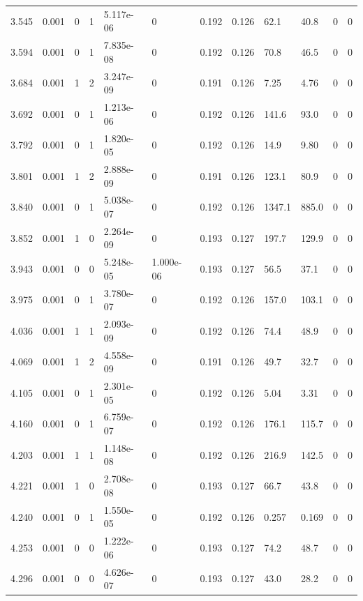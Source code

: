 \documentclass[preview]{standalone}
\begin{document}
{{{\begin{tabular}{L{1.2cm}C{1.2cm} C{0.3cm}C{0.5cm} C{1.4cm}C{1.4cm} C{1.4cm}C{1.4cm} C{1.6cm}C{1.6cm} C{1.6cm}C{1.6cm}}
  3.545  &  0.001  & 0     &  1 &  5.117e-06  & 0  &  0.192&   0.126& 62.1 & 40.8   &  0 & 0  \\ 
  3.594  &  0.001  & 0     &  1 &  7.835e-08  & 0  &  0.192&   0.126& 70.8 & 46.5   &  0 & 0  \\ 
  3.684  &  0.001  & 1     &  2 &  3.247e-09  & 0  &  0.191&   0.126& 7.25 & 4.76   &  0 & 0  \\ 
  3.692  &  0.001  & 0     &  1 &  1.213e-06  & 0  &  0.192&   0.126& 141.6 & 93.0   &  0 & 0  \\ 
  3.792  &  0.001  & 0     &  1 &  1.820e-05  & 0  &  0.192&   0.126& 14.9 & 9.80   &  0 & 0  \\ 
  3.801  &  0.001  & 1     &  2 &  2.888e-09  & 0  &  0.191&   0.126& 123.1 & 80.9   &  0 & 0  \\ 
  3.840  &  0.001  & 0     &  1 &  5.038e-07  & 0  &  0.192&   0.126& 1347.1 & 885.0   &  0 & 0  \\ 
  3.852  &  0.001  & 1     &  0 &  2.264e-09  & 0  &  0.193&   0.127& 197.7 & 129.9   &  0 & 0  \\ 
  3.943  &  0.001  & 0     &  0 &  5.248e-05  & 1.000e-06  &  0.193&   0.127& 56.5 & 37.1   &  0 & 0  \\ 
  3.975  &  0.001  & 0     &  1 &  3.780e-07  & 0  &  0.192&   0.126& 157.0 & 103.1   &  0 & 0  \\ 
  4.036  &  0.001  & 1     &  1 &  2.093e-09  & 0  &  0.192&   0.126& 74.4 & 48.9   &  0 & 0  \\ 
  4.069  &  0.001  & 1     &  2 &  4.558e-09  & 0  &  0.191&   0.126& 49.7 & 32.7   &  0 & 0  \\ 
  4.105  &  0.001  & 0     &  1 &  2.301e-05  & 0  &  0.192&   0.126& 5.04 & 3.31   &  0 & 0  \\ 
  4.160  &  0.001  & 0     &  1 &  6.759e-07  & 0  &  0.192&   0.126& 176.1 & 115.7   &  0 & 0  \\ 
  4.203  &  0.001  & 1     &  1 &  1.148e-08  & 0  &  0.192&   0.126& 216.9 & 142.5   &  0 & 0  \\ 
  4.221  &  0.001  & 1     &  0 &  2.708e-08  & 0  &  0.193&   0.127& 66.7 & 43.8   &  0 & 0  \\ 
  4.240  &  0.001  & 0     &  1 &  1.550e-05  & 0  &  0.192&   0.126& 0.257 & 0.169   &  0 & 0  \\ 
  4.253  &  0.001  & 0     &  0 &  1.222e-06  & 0  &  0.193&   0.127& 74.2 & 48.7   &  0 & 0  \\ 
  4.296  &  0.001  & 0     &  0 &  4.626e-07  & 0  &  0.193&   0.127& 43.0 & 28.2   &  0 & 0  \\ 

\end{tabular}}}}
\end{document}
